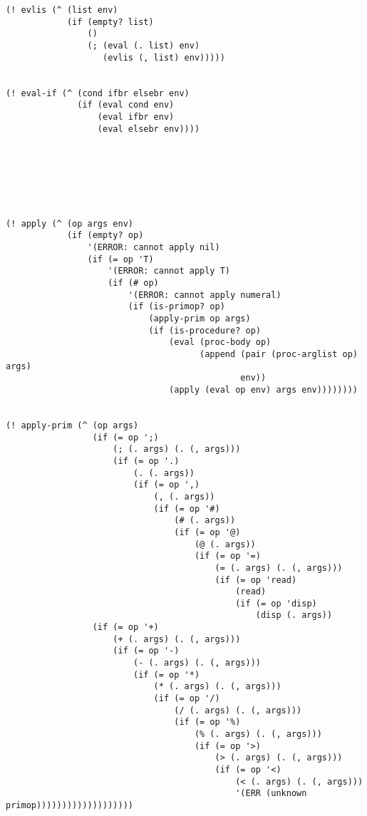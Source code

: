 \documentclass[a4paper]{article}
\begin{document}
\begin{verbatim}
(! evlis (^ (list env)
            (if (empty? list)
                ()
                (; (eval (. list) env)
                   (evlis (, list) env)))))


(! eval-if (^ (cond ifbr elsebr env)
              (if (eval cond env)
                  (eval ifbr env)
                  (eval elsebr env))))







(! apply (^ (op args env)
            (if (empty? op)
                '(ERROR: cannot apply nil)
                (if (= op 'T)
                    '(ERROR: cannot apply T)
                    (if (# op)
                        '(ERROR: cannot apply numeral)
                        (if (is-primop? op)
                            (apply-prim op args)
                            (if (is-procedure? op)
                                (eval (proc-body op)
                                      (append (pair (proc-arglist op) args)
                                              env))
                                (apply (eval op env) args env))))))))


(! apply-prim (^ (op args)
                 (if (= op ';)
                     (; (. args) (. (, args)))
                     (if (= op '.)
                         (. (. args))
                         (if (= op ',)
                             (, (. args))
                             (if (= op '#)
                                 (# (. args))
                                 (if (= op '@)
                                     (@ (. args))
                                     (if (= op '=)
                                         (= (. args) (. (, args)))
                                         (if (= op 'read)
                                             (read)
                                             (if (= op 'disp)
                                                 (disp (. args))
                 (if (= op '+)
                     (+ (. args) (. (, args)))
                     (if (= op '-)
                         (- (. args) (. (, args)))
                         (if (= op '*)
                             (* (. args) (. (, args)))
                             (if (= op '/)
                                 (/ (. args) (. (, args)))
                                 (if (= op '%)
                                     (% (. args) (. (, args)))
                                     (if (= op '>)
                                         (> (. args) (. (, args)))
                                         (if (= op '<)
                                             (< (. args) (. (, args)))
                                             '(ERR (unknown primop)))))))))))))))))))
                                  





\end{verbatim}
\end{document}
